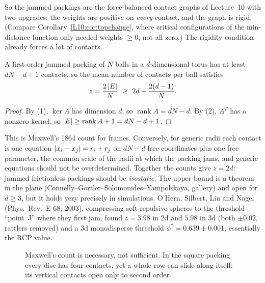 So the jammed packings are the force-balanced contact graphs of Lecture~10 with two upgrades: the
weights are positive on \emph{every} contact, and the graph is rigid. (Compare
Corollary~\ref{L10:cor:topchange}, where critical configurations of the min-distance function only
needed weights $\ge0$, not all zero.) The rigidity condition already forces a lot of contacts.

\begin{corollary}\label{SM:cor:maxwell}
A first-order jammed packing of $N$ balls in a $d$-dimensional torus has at least $dN-d+1$ contacts, so the
mean number of contacts per ball satisfies
\[
  z=\frac{2\abs E}{N}\ \ge\ 2d-\frac{2(d-1)}{N}.
\]
\end{corollary}

\begin{proof}
By (1), $\ker A$ has dimension $d$, so $\operatorname{rank}A=dN-d$. By (2), $A^T$ has a nonzero kernel, so
$\left\lvert E \right\rvert\ge\operatorname{rank}A+1=dN-d+1$.
\end{proof}

This is Maxwell's 1864 count for frames. Conversely, for generic radii each contact is one equation
$\left\lvert x_i-x_j \right\rvert=r_i+r_j$ on $dN-d$ free coordinates plus one free parameter, the common scale of the radii
at which the packing jams, and generic equations should not be overdetermined.
Together the counts give $z=2d$: jammed frictionless packings should be \emph{isostatic}. The upper bound
is a theorem in the plane (Connelly--Gortler--Solomonides--Yampolskaya, gallery) and open for $d\ge3$, but
it holds very precisely in simulations. O'Hern, Silbert, Liu and Nagel (Phys.\ Rev.~E 68, 2003), compressing
soft repulsive spheres to the threshold ``point~J'' where they first jam, found $z=3.98$ in $2$d and $5.98$ in
$3$d (both $\pm0.02$, rattlers removed) and a $3$d monodisperse threshold $\phi^*=0.639\pm0.001$,
essentially the RCP value.

\begin{figure}[ht]
\centering
{}
\caption{Maxwell's count is necessary, not sufficient. In the square packing every disc has four
contacts, yet a whole row can slide along itself: its vertical contacts open only to second order.}
\label{SM:fig:maxwell}
\end{figure}


